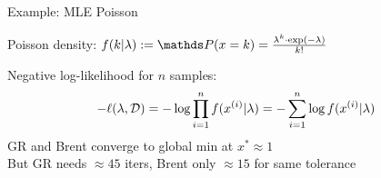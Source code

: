\documentclass[11pt,compress,t,notes=noshow, xcolor=table]{beamer}
\newcommand{\xii}{x^{(i)}}
\begin{document}
\begin{framei}{Example: MLE Poisson}
\item Poisson density: $f(k|\lambda) := \P(x = k) = \frac{\lambda^k \cdot \exp(-\lambda)}{k!}$
\item Negative log-likelihood for $n$ samples:
\begin{equation*}
- \ell(\lambda, \mathcal{D}) = - \log \prodin  f(\xii | \lambda) =  - \sumin \log f(\xii | \lambda) 
\end{equation*}
GR and Brent converge to global min at $x^\ast \approx 1$ \\
But GR needs $\approx 45$ iters, Brent only $\approx 15$ for same tolerance
\end{framei}

\endlecture
\end{document}
